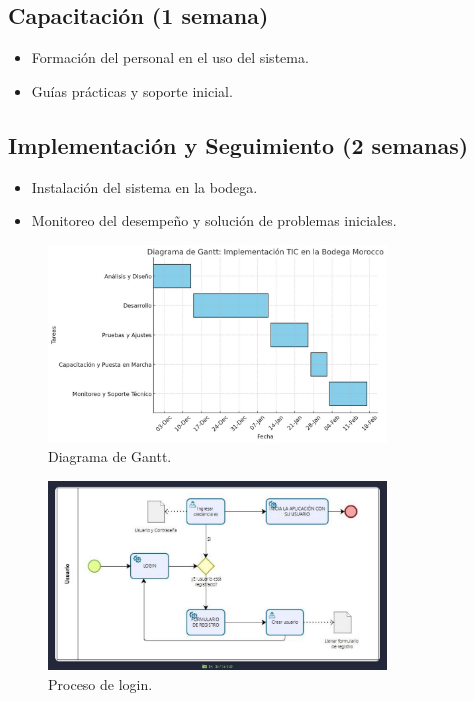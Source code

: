 \documentclass{article}
\begin{document}
\subsection{Capacitación (1 semana)}

    \begin{itemize}
      \item Formación del personal en el uso del sistema.
      \item Guías prácticas y soporte inicial.
    \end{itemize}


\subsection{Implementación y Seguimiento (2 semanas)}


    \begin{itemize}
      \item Instalación del sistema en la bodega.
      \item Monitoreo del desempeño y solución de problemas iniciales.
    \end{itemize}

\newpage

\begin{figure}[H]
  \centering
  \includegraphics[width=0.8\textwidth]{./assets/gantt.jpeg}
  \caption{Diagrama de Gantt.}
\end{figure}

\begin{figure}[H]
  \centering
  \includegraphics[width=0.8\textwidth]{./assets/p-login.png}
  \caption{Proceso de login.}
\end{figure}
\end{document}
